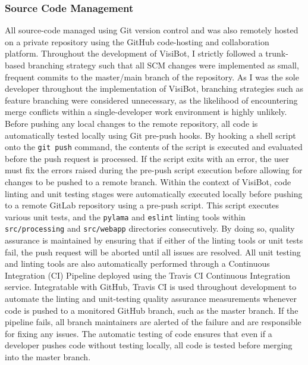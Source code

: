 \subsubsection{Source Code Management}

All source-code managed using Git \citep{Git} version control and was also remotely hosted on a private repository using the GitHub \citep{GitHub} code-hosting and collaboration platform. Throughout the development of VisiBot, I strictly followed a trunk-based branching strategy such that all SCM changes were implemented as small, frequent commits to the master/main branch of the repository. As I was the sole developer throughout the implementation of VisiBot, branching strategies such as feature branching were considered unnecessary, as the likelihood of encountering merge conflicts within a single-developer work environment is highly unlikely. Before pushing any local changes to the remote repository, all code is automatically tested locally using Git pre-push hooks. \citep{PrePushHooks} By hooking a shell script onto the \texttt{git push} command, the contents of the script is executed and evaluated before the push request is processed. If the script exits with an error, the user must fix the errors raised during the pre-push script execution before allowing for changes to be pushed to a remote branch. Within the context of VisiBot, code linting and unit testing stages were automatically executed locally before pushing to a remote GitLab repository using a pre-push script. This script executes various unit tests, and the \texttt{pylama} and \texttt{eslint} linting tools within \texttt{src/processing} and \texttt{src/webapp} directories consecutively. By doing so, quality assurance is maintained by ensuring that if either of the linting tools or unit tests fail, the push request will be aborted until all issues are resolved. All unit testing and linting tools are also automatically performed through a Continuous Integration (CI) Pipeline deployed using the Travis CI \citep{TravisCI} Continuous Integration service. Integratable with GitHub, Travis CI is used throughout development to automate the linting and unit-testing quality assurance measurements whenever code is pushed to a monitored GitHub branch, such as the master branch. If the pipeline fails, all branch maintainers are alerted of the failure and are responsible for fixing any issues. The automatic testing of code ensures that even if a developer pushes code without testing locally, all code is tested before merging into the master branch.
